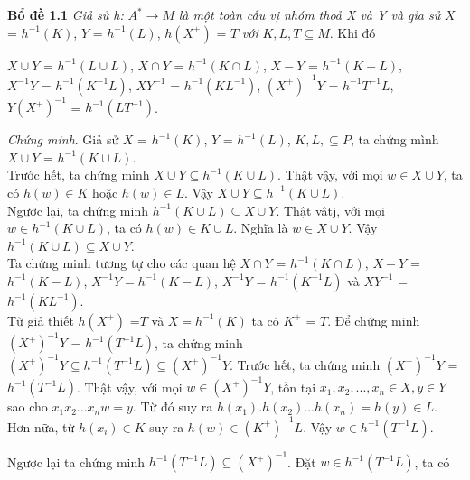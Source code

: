 \begin{flushleft}
\textbf{Bổ đề 1.1} \hspace{10mm} \textit{Giả sử h:} $A^* \to M$ \textit{là một toàn cấu vị nhóm thoả X và Y và gỉa sử} $X$ = $h^{-1}(K)$, $Y$ = $h^{-1}(L)$, $h(X^+)$ = $T$ \textit{với} $K, L, T \subseteq M$. Khi đó
\end{flushleft}
$X \cup Y$ = $h^{-1}(L \cup L)$, $X \cap Y$ = $h^{-1}(K \cap L)$, $X - Y$ = $h^{-1}(K - L)$,\\
$X^{-1}Y$ = $h^{-1}(K^{-1}L)$, $XY^{-1}$ = $h^{-1}(KL^{-1})$, $(X^+)^{-1}Y$ = $h^{-1}T^{-1}L$,\\
$Y(X^+)^{-1}$ = $h^{-1}(LT^{-1})$.
\begin{flushleft}
\textit{Chứng minh}. Giả sử $X$ = $h^{-1}(K)$, $Y$ = $h^{-1}(L)$, $K, L, \subseteq P$, ta chứng mình $X \cup Y$ = $h^{-1}(K \cup L)$. \\
\hspace{10mm}Trước hết, ta chứng minh $X \cup Y \subseteq h^{-1}(K \cup L)$. Thật vậy, với mọi $w \in X \cup Y$, ta có $h(w) \in K$ hoặc $h(w) \in L$. Vậy $X \cup Y \subseteq h^{-1}(K \cup L)$. \\
\hspace{10mm}Ngược lại, ta chứng minh $h^{-1}(K \cup L) \subseteq X \cup Y$. Thật vâtj, với mọi $w \in h^{-1}(K \cup L)$, ta có $h(w) \in K \cup L$. Nghĩa là $w \in X \cup Y$. Vậy $h^{-1}(K \cup L) \subseteq X \cup Y$. \\
\hspace{10mm}Ta chứng minh tương tự cho các quan hệ $X \cap Y$ = $h^{-1}(K \cap L)$, $X - Y$ = $h^{-1}(K - L)$, $X^{-1}Y = h^{-1}(K - L)$, $X^{-1}Y$ = $h^{-1}(K^{-1}L)$ và $XY^{-1}$ = $h^{-1}(KL^{-1})$. \\
\hspace{10mm}Từ giả thiết $h(X^+)$ =$T$ và $X = h^{-1}(K)$ ta có $K^+$ = $T$. Để chứng minh $(X^+)^{-1}Y$ = $h^{-1}(T^{-1}L)$, ta chứng minh $(X^+)^{-1}Y \subseteq h^{-1}(T^{-1}L) \subseteq (X^+)^{-1}Y$.
\hspace{10mm}Trước hết, ta chứng minh $(X^+)^{-1}Y$ = $h^{-1}(T^{-1}L)$. Thật vậy, với mọi $w \in (X^+)^{-1}Y$, tồn tại $x_1, x_2, ..., x_n \in X, y \in Y$ sao cho $x_1x_2...x_nw = y$. Từ đó suy ra $h(x_1).h(x_2)...h(x_n) = h(y) \in L$. Hơn nữa, từ $h(x_i) \in K$ suy ra $h(w) \in (K^+)^{-1}L$. Vậy $w \in h^{-1}(T^{-1}L)$. \\
\end{flushleft}
Ngược lại ta chứng minh $h^{-1}(T^{-1}L) \subseteq (X^+)^{-1}$. Đặt $w \in h^{-1}(T^{-1}L)$, ta có \\
